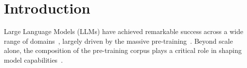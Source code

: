 \documentclass{article}
\theoremstyle{plain}
\theoremstyle{definition}
\theoremstyle{remark}
\begin{document}
\section{Introduction}


Large Language Models (LLMs) have achieved remarkable success across a wide range of domains~\citep{shao2024deepseekmath, guo2025deepseek, team2025kimi, bai2025qwen2}, largely driven by the massive pre-training~\citep{team2023gemini, achiam2023gpt}. 
Beyond scale alone, the composition of the pre-training corpus plays a critical role in shaping model capabilities~\citep{feng2024maximize, basant2025nvidia, blakeman2025nemotron}.


\end{document}
